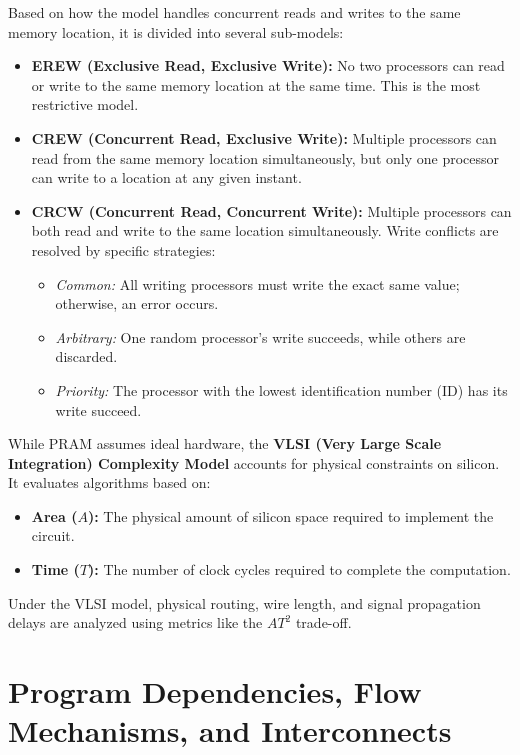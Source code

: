 \documentclass[12pt,a4paper,openany]{book}
\begin{document}
Based on how the model handles concurrent reads and writes to the same memory location, it is divided into several sub-models:
\begin{itemize}
    \item \textbf{EREW (Exclusive Read, Exclusive Write):} No two processors can read or write to the same memory location at the same time. This is the most restrictive model.
    \item \textbf{CREW (Concurrent Read, Exclusive Write):} Multiple processors can read from the same memory location simultaneously, but only one processor can write to a location at any given instant.
    \item \textbf{CRCW (Concurrent Read, Concurrent Write):} Multiple processors can both read and write to the same location simultaneously. Write conflicts are resolved by specific strategies:
          \begin{itemize}
              \item \textit{Common:} All writing processors must write the exact same value; otherwise, an error occurs.
              \item \textit{Arbitrary:} One random processor's write succeeds, while others are discarded.
              \item \textit{Priority:} The processor with the lowest identification number (ID) has its write succeed.
          \end{itemize}
\end{itemize}

While PRAM assumes ideal hardware, the \textbf{VLSI (Very Large Scale Integration) Complexity Model} accounts for physical constraints on silicon. It evaluates algorithms based on:
\begin{itemize}
    \item \textbf{Area ($A$):} The physical amount of silicon space required to implement the circuit.
    \item \textbf{Time ($T$):} The number of clock cycles required to complete the computation.
\end{itemize}
Under the VLSI model, physical routing, wire length, and signal propagation delays are analyzed using metrics like the $AT^2$ trade-off.

\chapter[Dependencies, Flow, and Interconnects]{Program Dependencies, Flow Mechanisms, and Interconnects}
\end{document}
